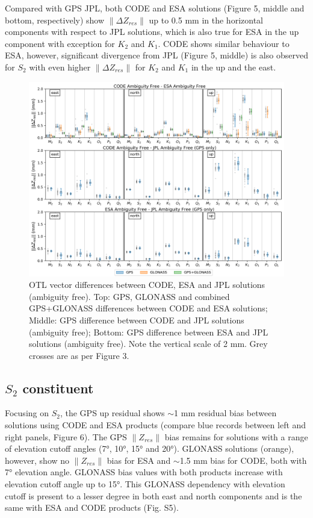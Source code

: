 \documentclass[se, manuscript]{copernicus}
\begin{document}
Compared with GPS JPL, both CODE and ESA solutions (Figure 5, middle and bottom, respectively) show $\|\Delta Z_{res}\|$ up to 0.5 mm in the horizontal components with respect to JPL solutions, which is also true for ESA in the up component with exception for $K_2$ and $K_1$. CODE shows similar behaviour to ESA, however, significant divergence from JPL (Figure 5, middle) is also observed for $S_2$ with even higher $\|\Delta Z_{res}\|$ for $K_2$ and $K_1$ in the up and the east.

\begin{figure}[t]
\includegraphics[width=17cm]{fig05.png}
\caption{OTL vector differences between CODE, ESA and JPL solutions (ambiguity free). Top: GPS, GLONASS and combined GPS+GLONASS differences between CODE and ESA solutions; Middle: GPS difference between CODE and JPL solutions (ambiguity free); Bottom: GPS difference between ESA and JPL solutions (ambiguity free). Note the vertical scale of 2 mm. Grey crosses are as per Figure 3. }
\end{figure}

\subsection{$S_2$ constituent}
Focusing on $S_2$, the GPS up residual shows $\sim$1 mm residual bias between solutions using CODE and ESA products (compare blue records between left and right panels, Figure 6). The GPS $\|Z_{res}\|$ bias remains for solutions with a range of elevation cutoff angles (7°, 10°, 15° and 20°). GLONASS solutions (orange), however, show no $\|Z_{res}\|$ bias for ESA and $\sim$1.5 mm bias for CODE, both with 7° elevation angle. GLONASS bias values with both products increase with elevation cutoff angle up to 15°. This GLONASS dependency with elevation cutoff is present to a lesser degree in both east and north components and is the same with ESA and CODE products (Fig. S5).
\end{document}
